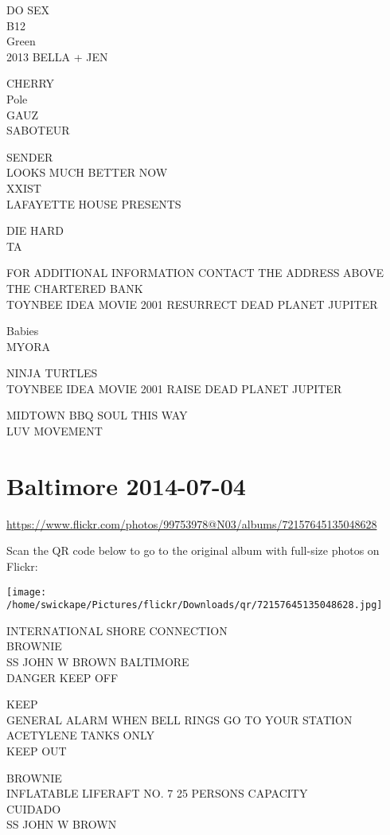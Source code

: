 \documentclass[10pt,letterpaper]{article}
\begin{document}
DO SEX\\
B12\\
Green\\
2013 BELLA + JEN

CHERRY\\
Pole\\
GAUZ\\
SABOTEUR

SENDER\\
LOOKS MUCH BETTER NOW\\
XXIST\\
LAFAYETTE HOUSE PRESENTS

DIE HARD\\
TA

FOR ADDITIONAL INFORMATION CONTACT THE ADDRESS ABOVE\\
THE CHARTERED BANK\\
TOYNBEE IDEA MOVIE 2001 RESURRECT DEAD PLANET JUPITER

Babies\\
MYORA

NINJA TURTLES\\
TOYNBEE IDEA MOVIE 2001 RAISE DEAD PLANET JUPITER

MIDTOWN BBQ SOUL THIS WAY\\
LUV MOVEMENT


\section*{Baltimore 2014-07-04}

\url{https://www.flickr.com/photos/99753978@N03/albums/72157645135048628}

Scan the QR code below to go to the original album with full-size photos on Flickr:

\texttt{[image: /home/swickape/Pictures/flickr/Downloads/qr/72157645135048628.jpg]}


INTERNATIONAL SHORE CONNECTION\\
BROWNIE\\
SS JOHN W BROWN BALTIMORE\\
DANGER KEEP OFF

KEEP\\
GENERAL ALARM WHEN BELL RINGS GO TO YOUR STATION\\
ACETYLENE TANKS ONLY\\
KEEP OUT

BROWNIE\\
INFLATABLE LIFERAFT NO. 7 25 PERSONS CAPACITY\\
CUIDADO\\
SS JOHN W BROWN
\end{document}
